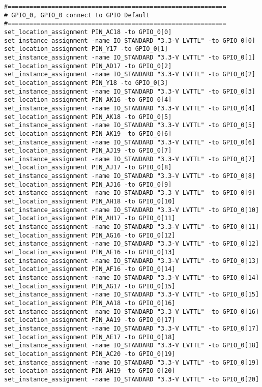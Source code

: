 \documentclass[dvipdfm]{book}
\begin{document}
\begin{verbatim}
#============================================================
# GPIO_0, GPIO_0 connect to GPIO Default
#============================================================
set_location_assignment PIN_AC18 -to GPIO_0[0]
set_instance_assignment -name IO_STANDARD "3.3-V LVTTL" -to GPIO_0[0]
set_location_assignment PIN_Y17 -to GPIO_0[1]
set_instance_assignment -name IO_STANDARD "3.3-V LVTTL" -to GPIO_0[1]
set_location_assignment PIN_AD17 -to GPIO_0[2]
set_instance_assignment -name IO_STANDARD "3.3-V LVTTL" -to GPIO_0[2]
set_location_assignment PIN_Y18 -to GPIO_0[3]
set_instance_assignment -name IO_STANDARD "3.3-V LVTTL" -to GPIO_0[3]
set_location_assignment PIN_AK16 -to GPIO_0[4]
set_instance_assignment -name IO_STANDARD "3.3-V LVTTL" -to GPIO_0[4]
set_location_assignment PIN_AK18 -to GPIO_0[5]
set_instance_assignment -name IO_STANDARD "3.3-V LVTTL" -to GPIO_0[5]
set_location_assignment PIN_AK19 -to GPIO_0[6]
set_instance_assignment -name IO_STANDARD "3.3-V LVTTL" -to GPIO_0[6]
set_location_assignment PIN_AJ19 -to GPIO_0[7]
set_instance_assignment -name IO_STANDARD "3.3-V LVTTL" -to GPIO_0[7]
set_location_assignment PIN_AJ17 -to GPIO_0[8]
set_instance_assignment -name IO_STANDARD "3.3-V LVTTL" -to GPIO_0[8]
set_location_assignment PIN_AJ16 -to GPIO_0[9]
set_instance_assignment -name IO_STANDARD "3.3-V LVTTL" -to GPIO_0[9]
set_location_assignment PIN_AH18 -to GPIO_0[10]
set_instance_assignment -name IO_STANDARD "3.3-V LVTTL" -to GPIO_0[10]
set_location_assignment PIN_AH17 -to GPIO_0[11]
set_instance_assignment -name IO_STANDARD "3.3-V LVTTL" -to GPIO_0[11]
set_location_assignment PIN_AG16 -to GPIO_0[12]
set_instance_assignment -name IO_STANDARD "3.3-V LVTTL" -to GPIO_0[12]
set_location_assignment PIN_AE16 -to GPIO_0[13]
set_instance_assignment -name IO_STANDARD "3.3-V LVTTL" -to GPIO_0[13]
set_location_assignment PIN_AF16 -to GPIO_0[14]
set_instance_assignment -name IO_STANDARD "3.3-V LVTTL" -to GPIO_0[14]
set_location_assignment PIN_AG17 -to GPIO_0[15]
set_instance_assignment -name IO_STANDARD "3.3-V LVTTL" -to GPIO_0[15]
set_location_assignment PIN_AA18 -to GPIO_0[16]
set_instance_assignment -name IO_STANDARD "3.3-V LVTTL" -to GPIO_0[16]
set_location_assignment PIN_AA19 -to GPIO_0[17]
set_instance_assignment -name IO_STANDARD "3.3-V LVTTL" -to GPIO_0[17]
set_location_assignment PIN_AE17 -to GPIO_0[18]
set_instance_assignment -name IO_STANDARD "3.3-V LVTTL" -to GPIO_0[18]
set_location_assignment PIN_AC20 -to GPIO_0[19]
set_instance_assignment -name IO_STANDARD "3.3-V LVTTL" -to GPIO_0[19]
set_location_assignment PIN_AH19 -to GPIO_0[20]
set_instance_assignment -name IO_STANDARD "3.3-V LVTTL" -to GPIO_0[20]

\end{verbatim}
\end{document}
